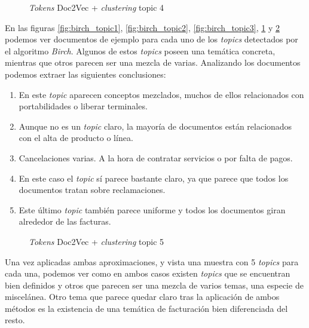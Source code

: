 \begin{figure}[!ht]
	\centering
    \caption{\textit{Tokens} Doc2Vec + \textit{clustering} topic 4}
    \label{fig:birch_topic4}
\end{figure}






En las figuras \ref{fig:birch_topic1}, \ref{fig:birch_topic2}, \ref{fig:birch_topic3}, \ref{fig:birch_topic4} y \ref{fig:birch_topic5} podemos ver documentos de ejemplo para cada uno de los \textit{topics} detectados por el algoritmo \textit{Birch}. Algunos de estos \textit{topics} poseen una temática concreta, mientras que otros parecen ser una mezcla de varias. Analizando los documentos podemos extraer las siguientes conclusiones:

\begin{enumerate}
\item En este \textit{topic} aparecen conceptos mezclados, muchos de ellos relacionados con portabilidades o liberar terminales.
\item Aunque no es un \textit{topic} claro, la mayoría de documentos están relacionados con el alta de producto o línea. 
\item Cancelaciones varias. A la hora de contratar servicios o por falta de pagos.
\item En este caso el \textit{topic} sí parece bastante claro, ya que parece que todos los documentos tratan sobre reclamaciones. 
\item Este último \textit{topic} también parece uniforme y todos los documentos giran alrededor de las facturas.
\end{enumerate}
\clearpage

\begin{figure}[!ht]
	\centering
    \caption{\textit{Tokens} Doc2Vec + \textit{clustering} topic 5}
    \label{fig:birch_topic5}
\end{figure}


Una vez aplicadas ambas aproximaciones, y vista una muestra con 5 \textit{topics} para cada una, podemos ver como en ambos casos existen \textit{topics} que se encuentran bien definidos y otros que parecen ser una mezcla de varios temas, una especie de miscelánea. Otro tema que parece quedar claro tras la aplicación de ambos métodos es la existencia de una temática de facturación bien diferenciada del resto.


